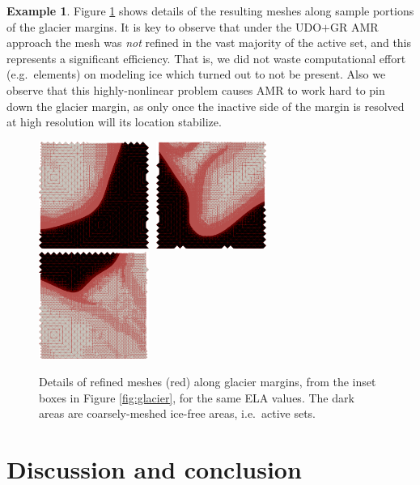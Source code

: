 \documentclass[]{interact}
\theoremstyle{plain}%
\theoremstyle{definition}
\newtheorem{example}[theorem]{Example}
\theoremstyle{remark}
\begin{document}
\begin{example}
Figure \ref{fig:insetmeshes} shows details of the resulting meshes along sample portions of the glacier margins.  It is key to observe that under the UDO$+$GR AMR approach the mesh was \emph{not} refined in the vast majority of the active set, and this represents a significant efficiency.  That is, we did not waste computational effort (e.g.~elements) on modeling ice which turned out to not be present.  Also we observe that this highly-nonlinear problem causes AMR to work hard to pin down the glacier margin, as only once the inactive side of the margin is resolved at high resolution will its location stabilize.
\begin{figure}[ht]
\centering
\mbox{\includegraphics[width=0.32\textwidth]{static/glacier/sub1000.png} \,\includegraphics[width=0.32\textwidth]{static/glacier/sub800.png} \,\includegraphics[width=0.32\textwidth]{static/glacier/sub600.png}}
\caption{Details of refined meshes (red) along glacier margins, from the inset boxes in Figure \ref{fig:glacier}, for the same ELA values.  The dark areas are coarsely-meshed ice-free areas, i.e.~active sets.}
\label{fig:insetmeshes}
\end{figure}
\end{example}


\section{Discussion and conclusion} \label{sec:conclusion}
\end{document}
